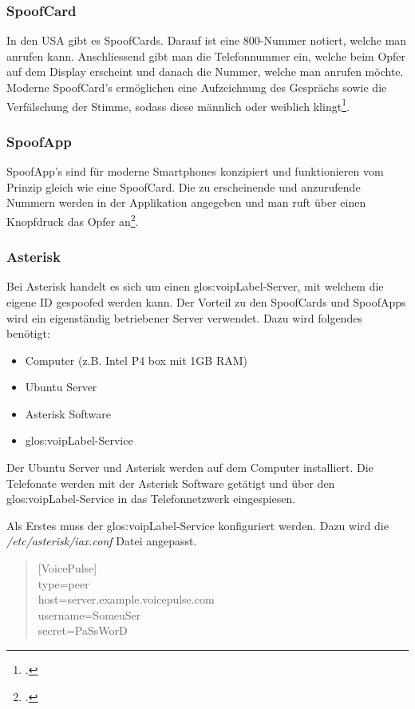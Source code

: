 \subsubsection{SpoofCard}
In den USA gibt es SpoofCards. Darauf ist eine 800-Nummer notiert, welche man anrufen kann. Anschliessend gibt man die Telefonnummer ein, welche beim Opfer auf dem Display erscheint und danach die Nummer, welche man anrufen möchte. Moderne SpoofCard's ermöglichen eine Aufzeichnung des Gesprächs sowie die Verfälschung der Stimme, sodass diese männlich oder weiblich klingt\footcite{human_hacking}.

\subsubsection{SpoofApp}
SpoofApp's sind für moderne Smartphones konzipiert und funktionieren vom Prinzip gleich wie eine SpoofCard. Die zu erscheinende und anzurufende Nummern werden in der Applikation angegeben und man ruft über einen Knopfdruck das Opfer an\footcite{human_hacking}.

\subsubsection{Asterisk} 
Bei Asterisk handelt es sich um einen \gls{glos:voipLabel}-Server, mit welchem die eigene ID gespoofed werden kann. Der Vorteil zu den SpoofCards und SpoofApps wird ein eigenständig betriebener Server verwendet. Dazu wird folgendes benötigt:
\begin{itemize}
\item Computer (z.B. Intel P4 box mit 1GB RAM)
\item Ubuntu Server
\item Asterisk Software
\item \gls{glos:voipLabel}-Service
\end{itemize}

Der Ubuntu Server und Asterisk werden auf dem Computer installiert. Die Telefonate werden mit der Asterisk Software getätigt und über den \gls{glos:voipLabel}-Service in das Telefonnetzwerk eingespiesen.

Als Erstes muss der \gls{glos:voipLabel}-Service konfiguriert werden. Dazu wird die \textit{/etc/asterisk/iax.conf} Datei angepasst. 
\begin{quote}
[VoicePulse]\\
type=peer\\
host=server.example.voicepulse.com\\
username=SomeuSer\\
secret=PaSsWorD\\
\end{quote} 

